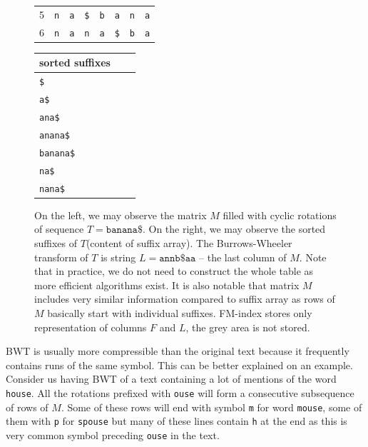 \begin{figure}
{\begin{tabular}{l|c|ccccc|c|}
	5 & {\tt n}		& \multicolumn{1}{c|}{{\color[HTML]{C0C0C0} \tt a}}		& \multicolumn{1}{c|}{{\color[HTML]{C0C0C0} \tt \$}}& \multicolumn{1}{c|}{{\color[HTML]{C0C0C0} \tt b}}	& \multicolumn{1}{c|}{{\color[HTML]{C0C0C0} \tt a}}	& {\color[HTML]{C0C0C0} \tt n}  & {\tt a}  \\ \cline{2-8} 
	6 & {\tt n}		& \multicolumn{1}{c|}{{\color[HTML]{C0C0C0} \tt a}}		& \multicolumn{1}{c|}{{\color[HTML]{C0C0C0} \tt n}}	& \multicolumn{1}{c|}{{\color[HTML]{C0C0C0} \tt a}}	& \multicolumn{1}{c|}{{\color[HTML]{C0C0C0} \tt \$}}& {\color[HTML]{C0C0C0} \tt b}  & {\tt a}  \\ \cline{2-8} 
	\end{tabular}
	\hspace{4em}
	\begin{tabular}{l l l}
		sorted suffixes\\
	\hline
		\tt \$ \\
		\tt a\$ \\
		\tt ana\$ \\
		\tt anana\$ \\
		\tt banana\$ \\
		\tt na\$ \\
		\tt nana\$ \\
	\end{tabular}
	}
	\caption[TODO]{On the left, we may observe the matrix $M$ filled with cyclic rotations of sequence
	$T = \mathtt{banana\$}$. On the right, we may observe the sorted suffixes of $T$(content of suffix array). The
	Burrows-Wheeler transform of $T$ is string $L=\mathtt{annb\$aa}$ -- the last column of $M$.
	Note that in practice, we do not need to construct the whole table as more efficient algorithms exist.
	It is also notable that matrix $M$ includes very similar information compared to suffix array as
	rows of $M$ basically start with individual suffixes. FM-index stores only representation of columns $F$
	and $L$, the grey area is not stored.
	}
	\label{obr:BWT}
\end{figure}

BWT is usually more compressible than the original text because it frequently contains runs of the same
symbol. This can be better explained on an example. Consider us having BWT of a text containing
a lot of mentions of the word {\tt house}. All the rotations prefixed with {\tt ouse} will form a
consecutive subsequence of rows of $M$. Some of these rows will end with symbol {\tt m} for word {\tt mouse},
some of them with {\tt p} for {\tt spouse} but many of these lines contain {\tt h} at the end as this
is very common symbol preceding {\tt ouse} in the text.

